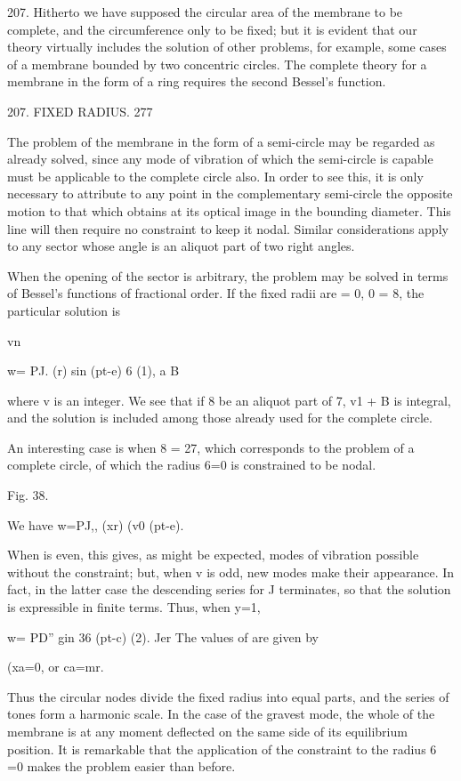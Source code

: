207. Hitherto we have supposed the circular area of the membrane to be
complete, and the circumference only to be fixed; but it is evident that
our theory virtually includes the solution of other problems, for
example, some cases of a membrane bounded by two concentric circles. The
complete theory for a membrane in the form of a ring requires the second
Bessel's function.

207. FIXED RADIUS. 277

The problem of the membrane in the form of a semi-circle may be regarded
as already solved, since any mode of vibration of which the semi-circle
is capable must be applicable to the
complete circle also. In order to see this, it is only necessary to
attribute to any point in the complementary semi-circle the opposite
motion to that which obtains at its optical image in the bounding
diameter. This line will then require no constraint to keep it nodal.
Similar considerations apply to any sector
whose angle is an aliquot part of two right angles.

When the opening of the sector is arbitrary, the problem may be solved
in terms of Bessel's functions of fractional order. If the fixed radii
are = 0, 0 = 8, the particular solution is

vn

w= PJ. (r) sin (pt-e) 6 (1), a B

where v is an integer. We see that if 8 be an aliquot part of 7, v1 + B
is integral, and the solution is included among those already used for
the complete circle.

An interesting case is when 8 = 27, which corresponds to the problem of
a complete circle, of which the radius 6=0 is constrained to be nodal.

Fig. 38.

We have w=PJ,, (xr) (v0 (pt-e).

When is even, this gives, as might be expected, modes of vibration
possible without the constraint; but, when v is odd, new modes make
their appearance. In fact, in the latter case the descending series for
J terminates, so that the solution is expressible in finite terms. Thus,
when y=1,

w= PD'' gin 36 (pt-c) (2). Jer The values of are given by

(xa=0, or ca=mr.

Thus the circular nodes divide the fixed radius into equal parts, and
the series of tones form a harmonic scale. In the case of the gravest
mode, the whole of the membrane is at any moment deflected on the same
side of its equilibrium position. It is remarkable that the application
of the constraint to the radius 6 =0 makes the problem easier than
before.

